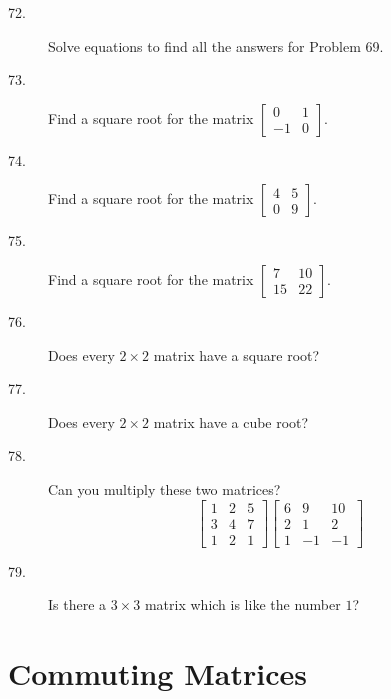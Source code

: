 \documentclass{article}
\begin{document}
\begin{description}
  \item[72.] Solve equations to find all the answers for Problem 69.

  \item[73.] Find a square root for the matrix $\begin{bmatrix} 0 & 1 \\ -1 & 0 \end{bmatrix}$.

  \item[74.] Find a square root for the matrix $\begin{bmatrix} 4 & 5 \\ 0 & 9 \end{bmatrix}$.

  \item[75.] Find a square root for the matrix $\begin{bmatrix} 7 & 10 \\ 15 & 22 \end{bmatrix}$.

  \item[76.] Does every $2 \times 2$ matrix have a square root?

  \item[77.] Does every $2 \times 2$ matrix have a cube root?

  \item[78.] Can you multiply these two matrices?
    \begin{equation*}
    \begin{bmatrix} 1 & 2 & 5 \\ 3 & 4 & 7 \\ 1 & 2 & 1 \end{bmatrix}  \begin{bmatrix} 6 & 9 & 10 \\ 2 & 1 & 2 \\ 1 & -1 & -1 \end{bmatrix}
    \end{equation*}

  \item[79.] Is there a $3 \times 3$ matrix which is like the number $1$?

\end{description}




\newpage

\section{Commuting Matrices}
\end{document}
